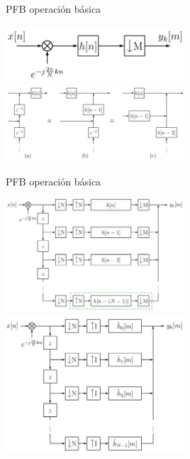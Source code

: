 \documentclass[ignorenonframetext,12pt]{beamer}
\begin{document}
\begin{frame}{PFB operación básica}
        \begin{center}
                \includegraphics[width=0.5\textwidth]{PFB_basic_operation}\\
                \includegraphics[width=0.5\textwidth]{PFB_distribution_filter_branches}
        \end{center}
\end{frame}

\begin{frame}{PFB operación básica}
        \begin{center}
                \includegraphics[width=0.5\textwidth]{PFB_distribution_filter_decimators}\\
                \includegraphics[width=0.5\textwidth]{PFB_distribution_filter_interpolators}
        \end{center}
\end{frame}
\end{document}
